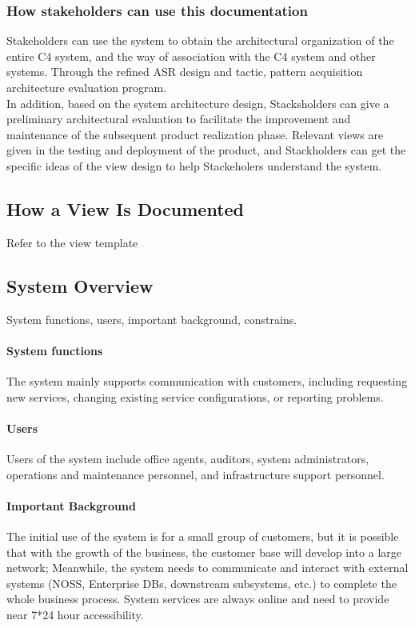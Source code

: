 \documentclass{article}
\begin{document}
	\subsubsection{How stakeholders can use this documentation}
	Stakeholders can use the system to obtain the architectural organization of the entire C4 system, and the way of association with the C4 system and other systems.
	Through the refined ASR design and tactic, pattern acquisition architecture evaluation program.\\
	In addition, based on the system architecture design, Stacksholders can give a preliminary architectural evaluation to facilitate the improvement and maintenance of the subsequent product realization phase.
	Relevant views are given in the testing and deployment of the product, and Stackholders can get the specific ideas of the view design to help Stackeholers understand the system.\\
	\subsection{How a View Is Documented}
	Refer to the view template

	\subsection{System Overview}
	System functions, users, important background, constrains.
	\paragraph{System functions}
	The system mainly supports communication with customers, including requesting new services, changing existing service configurations, or reporting problems.
	\paragraph{Users}
	Users of the system include office agents, auditors, system administrators, operations and maintenance personnel, and infrastructure support personnel.
	\paragraph{Important Background}
	The initial use of the system is for a small group of customers, but it is possible that with the growth of the business, the customer base will develop into a large network; Meanwhile, the system needs to communicate and interact with external systems (NOSS, Enterprise DBs, downstream subsystems, etc.) to complete the whole business process. System services are always online and need to provide near 7*24 hour accessibility.
\end{document}

